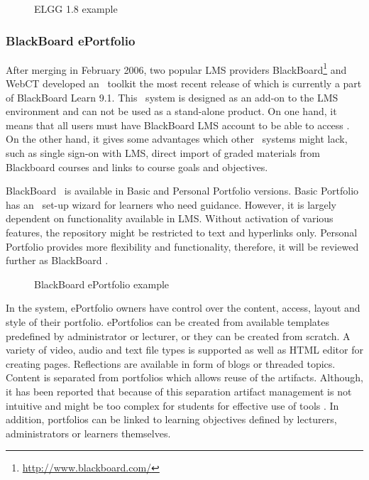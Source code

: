 \begin{figure}[htb]
\centering
\setlength\fboxsep{0pt}
\setlength\fboxrule{0.5pt}
\caption{ELGG 1.8 example}
\label{fig:elgg}
\end{figure}

\subsubsection{BlackBoard ePortfolio}
After merging in February 2006, two popular LMS providers
BlackBoard\footnote{\url{http://www.blackboard.com/}} and WebCT developed an
\ep~toolkit the most recent release of which is currently a part of BlackBoard
Learn 9.1. This \ep~system is designed as an add-on to the LMS environment and
can not be used as a stand-alone product. On one hand, it means that all users
must have BlackBoard LMS account to be able to access \ep. On the other hand, it
gives some advantages which other \ep~systems might lack, such as single sign-on
with LMS, direct import of graded materials from Blackboard courses and links to
course goals and objectives.

BlackBoard \ep~is available in Basic and Personal Portfolio versions. Basic
Portfolio has an \ep~set-up wizard for learners who need guidance. However, it
is largely dependent on functionality available in LMS. Without activation of
various features, the repository might be restricted to text and hyperlinks
only. Personal Portfolio provides more flexibility and functionality, therefore,
it will be reviewed further as BlackBoard \ep.

\begin{figure}[htb]
\centering 
\setlength\fboxsep{0pt}
\setlength\fboxrule{0.5pt}
\fbox{\texttt{[image: CH4-F6-BB]}}
\caption[BlackBoard ePortfolio example]{BlackBoard ePortfolio example
\citep{UniversityofTorontoScarborough2010}}
\label{fig:bbep}
\end{figure}

In the system, ePortfolio owners have control over the content, access, layout
and style of their portfolio. ePortfolios can be created from available
templates predefined by administrator or lecturer, or they can be created from
scratch. A variety of video, audio and text file types is supported as well as
HTML editor for creating pages. Reflections are available in form of blogs or
threaded topics. Content is separated from portfolios which allows reuse of the
artifacts. Although, it has been reported that because of this separation
artifact management is not intuitive and might be too complex for students for
effective use of tools \citep{Clark2009}. In addition, portfolios can be linked
to learning objectives defined by lecturers, administrators or learners themselves.

